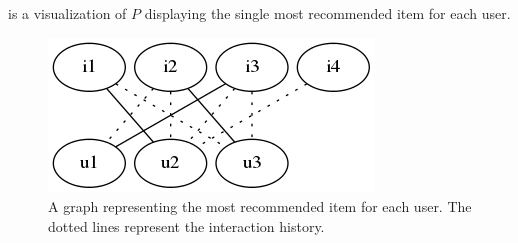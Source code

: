  is a visualization of $P$ displaying the single most recommended item for each user.

\begin{figure}[h!]
    \centering
    \includegraphics[width=0.3\linewidth]{fig/example_run/item_user_graph_katz_rec.png}
    \caption{A graph representing the most recommended item for each user. The dotted lines represent the interaction history.}
    \label{fig:ex_graph_katz_rec}
\end{figure}

\FloatBarrier

